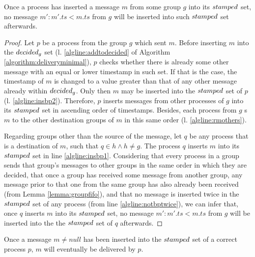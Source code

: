 \documentclass[times, 10pt]{article}
\begin{document}
\begin{lems} \label{lemma:oncedecidednotsmaller}
  Once a process has inserted a message $m$ from some group $g$ into its $stamped$ set, no message $m' : m'.ts < m.ts$ from $g$ will be inserted into such $stamped$ set afterwards.
\end{lems}

\begin{proof}
Let $p$ be a process from the group $g$ which sent $m$. Before inserting $m$ into the $decided\text{$_g$}$ set (l. \ref{algline:addtodecided} of Algorithm \ref{algorithm:deliveryminimal}), $p$ checks whether there is already some other message with an equal or lower timestamp in such set. If that is the case, the timestamp of $m$ is changed to a value greater than that of any other message already within $decided\text{$_g$}$. Only then $m$ may be inserted into the $stamped$ set of $p$ (l. \ref{algline:insbp2}). Therefore, $p$ inserts messages from other processes of $g$ into its $stamped$ set in ascending order of timestamps. Besides, each process from $g$ \rmcast{}s $m$ to the other destination groups of $m$ in this same order (l. \ref{algline:rmothers}).

Regarding groups other than the source of the message, let $q$ be any process that is a destination of $m$, such that $q \in h \wedge h \neq g$. The process $q$ inserts $m$ into its $stamped$ set in line \ref{algline:insbp1}. Considering that every process in a group sends that group's messages to other groups in the same order in which they are decided, that once a group has received some message from another group, any message prior to that one from the same group has also already been received (from Lemma \ref{lemma:groupfifo}), and that no message is inserted twice in the $stamped$ set of any process (from line \ref{algline:notbptwice}), %
we can infer that, once $q$ inserts $m$ into its $stamped$ set, no message $m' : m'.ts < m.ts$ from $g$ will be inserted into the the $stamped$ set of $q$ afterwards.
\end{proof}

\begin{lems} \label{lemma:oncebpwilldel}
Once a message $m \neq null$ has been inserted into the $stamped$ set of a correct process $p$, $m$ will eventually be delivered by $p$.
\end{lems}
\end{document}
